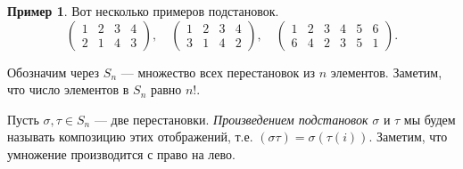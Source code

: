 \documentclass[12pt, titlepage, oneside]{amsbook}
\theoremstyle{definition}
\newtheorem{example}[theorem]{Пример}
\theoremstyle{remark}
\begin{document}
\begin{example}
	Вот несколько примеров подстановок.
	$$\begin{pmatrix} 1 & 2 & 3 & 4 \\
                2 & 1 & 4 & 3\end{pmatrix},\quad\begin{pmatrix} 1 & 2 & 3 & 4 \\
                3 & 1 & 4 & 2\end{pmatrix},\quad \begin{pmatrix} 1 & 2 & 3 & 4 & 5 & 6 \\
                6 & 4 & 2 & 3 & 5 & 1\end{pmatrix}.$$
\end{example}

Обозначим через $S_n$ --- множество всех перестановок из $n$ элементов. Заметим, что число элементов в $S_n$ равно $n!$.

Пусть $\sigma,\tau\in S_n$ --- две перестановки. \emph{Произведением подстановок} $\sigma$ и $\tau$ мы будем называть композицию этих отображений, т.е. $(\sigma\tau)=\sigma(\tau(i))$. Заметим, что умножение производится с право на лево.
\end{document}
